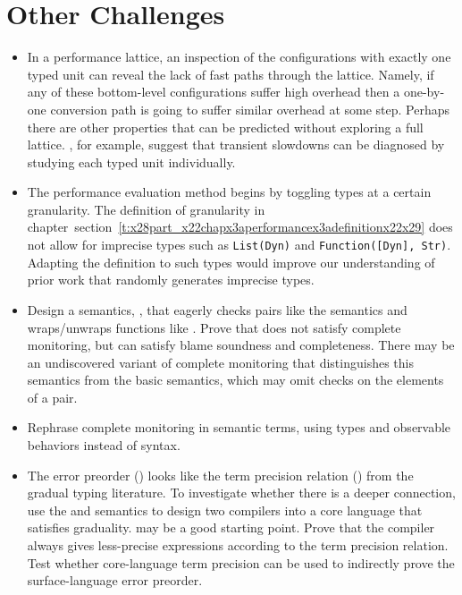 \documentclass[ twoside,open=right,titlepage,numbers=noenddot,headinclude,%
                footinclude=true,cleardoublepage=empty,abstract=off,
                BCOR=5mm,paper=a4,fontsize=11pt,%
                ngerman,american,%
                parts,pdfspacing]{scrreprt}
\newcommand{\SecRef}[2]{section~#1}
\newcommand{\SecRefLocal}[3]{\hyperref[#1]{\SecRef{#2}{#3}}}
\newcommand{\Scribtexttt}[1]{{\texttt{#1}}}
\newlength{\stabLeft}
\newcommand{\atItemizeStart}[0]{\addtolength{\stabLeft}{\labelsep}
                                \addtolength{\stabLeft}{\labelwidth}}
\let\SOriginalthesubsubsection\thesubsubsection
\newcommand{\Ssubsection}[2]{\subsection[#1]{#2}\let\thesubsubsection\SOriginalthesubsubsection}
\renewcommand{\Ssubsection}[2]{\section[#1]{#2}}
\renewcommand{\SecRefLocal}[3]{section~\ref{#1}}
\begin{document}
\Ssubsection{Other Challenges}{Other Challenges}\label{t:x28part_x22Otherx5fChallengesx22x29}

\begin{itemize}\atItemizeStart

\item In a performance lattice, an inspection of the configurations with exactly
 one typed unit can reveal the lack of fast paths through the lattice.
Namely, if any of these bottom{-}level configurations suffer high overhead
 then a one{-}by{-}one conversion path is going to suffer similar overhead
 at some step.
Perhaps there are other properties that can be predicted without exploring
 a full lattice.
, for example, suggest that transient slowdowns
 can be diagnosed by studying each typed unit individually.

\item The performance evaluation method begins by toggling types at a
 certain granularity.
The definition of granularity in chapter~\SecRefLocal{t:x28part_x22chapx3aperformancex3adefinitionx22x29}{3.2.2}{By Definition} does not
 allow for imprecise types such as \Scribtexttt{List(Dyn)} and \Scribtexttt{Function([Dyn], Str)}.
Adapting the definition to such types would improve our understanding of
 prior work that randomly generates imprecise types.

\item Design a semantics, \relax{\xsym}, that eagerly checks pairs like the \relax{\nname{}} semantics
 and wraps/unwraps functions like \relax{\fname{}}.
Prove that \relax{\xsym} does not satisfy complete monitoring,
 but can satisfy blame soundness and completeness.
There may be an undiscovered variant of complete monitoring that
 distinguishes this \relax{\xsym} semantics from the basic \relax{\fname{}} semantics,
 which may omit checks on the elements of a pair.

\item Rephrase complete monitoring in semantic terms, using types and observable
 behaviors instead of syntax.

\item The error preorder (\relax{$\sbehaviorle$}) looks like the term precision
 relation (\relax{$\sqle$}) from the gradual typing literature.
To investigate whether there is a deeper connection,
 use the \relax{\nname{}} and \relax{\fname{}} semantics to design two compilers into a core
 language that satisfies graduality.
\relax{\kafka} may be a good starting point.
Prove that the \relax{\fname{}} compiler always gives less{-}precise expressions according
 to the term precision relation.
Test whether core{-}language term precision can be used to indirectly prove the surface{-}language error preorder.


\end{itemize}
\end{document}

